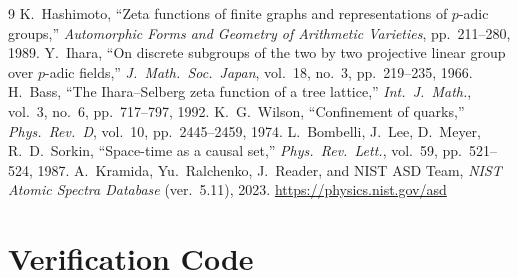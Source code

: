 \documentclass[11pt,a4paper]{article}
\begin{document}
\begin{thebibliography}{9}
 K.~Hashimoto, ``Zeta functions of finite graphs and representations of $p$-adic groups,'' \textit{Automorphic Forms and Geometry of Arithmetic Varieties}, pp.~211--280, 1989.
 Y.~Ihara, ``On discrete subgroups of the two by two projective linear group over $p$-adic fields,'' \textit{J.\ Math.\ Soc.\ Japan}, vol.~18, no.~3, pp.~219--235, 1966.
 H.~Bass, ``The Ihara--Selberg zeta function of a tree lattice,'' \textit{Int.\ J.\ Math.}, vol.~3, no.~6, pp.~717--797, 1992.
 K.~G.~Wilson, ``Confinement of quarks,'' \textit{Phys.\ Rev.\ D}, vol.~10, pp.~2445--2459, 1974.
 L.~Bombelli, J.~Lee, D.~Meyer, R.~D.~Sorkin, ``Space-time as a causal set,'' \textit{Phys.\ Rev.\ Lett.}, vol.~59, pp.~521--524, 1987.
 A.~Kramida, Yu.~Ralchenko, J.~Reader, and NIST ASD Team, \textit{NIST Atomic Spectra Database} (ver.~5.11), 2023. \url{https://physics.nist.gov/asd}
\end{thebibliography}

\appendix
\section{Verification Code}\label{app:code}
\end{document}
